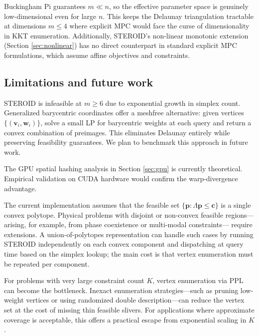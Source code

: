 \documentclass[review,onefignum,onetabnum]{./SIAM_template/siamart171218}
\begin{document}
Buckingham Pi guarantees $m \ll n$, so the effective parameter space is genuinely
low-dimensional even for large $n$.  This keeps the Delaunay triangulation
tractable at dimensions $m \leq 4$ where explicit MPC would face the curse of
dimensionality in KKT enumeration.  Additionally, STEROID's non-linear monotonic
extension (Section \ref{sec:nonlinear}) has no direct counterpart in standard
explicit MPC formulations, which assume affine objectives and constraints.

\subsection{Limitations and future work}

STEROID is infeasible at $m \geq 6$ due to exponential growth in simplex count.
Generalized barycentric coordinates \cite{Hormann2017} offer a meshfree alternative:
given vertices $\{(\mathbf{v}_i, \mathbf{w}_i)\}$, solve a small LP for barycentric
weights at each query and return a convex combination of preimages.  This eliminates
Delaunay entirely while preserving feasibility guarantees.  We plan to benchmark this
approach in future work.

The GPU spatial hashing analysis in Section \ref{sec:gpu} is currently theoretical.
Empirical validation on CUDA hardware would confirm the warp-divergence advantage.

The current implementation assumes that the feasible set $\{\mathbf{p} : \Lambda\mathbf{p} \leq \mathbf{c}\}$
is a single convex polytope.  Physical problems with disjoint or non-convex feasible
regions---arising, for example, from phase coexistence or multi-modal constraints---
require extensions.  A union-of-polytopes representation can handle such cases by
running STEROID independently on each convex component and dispatching at query time
based on the simplex lookup; the main cost is that vertex enumeration must be repeated
per component.

For problems with very large constraint count $K$, vertex enumeration via PPL can
become the bottleneck.  Inexact enumeration strategies---such as pruning low-weight
vertices or using randomized double description---can reduce the vertex set at the cost
of missing thin feasible slivers.  For applications where approximate coverage is
acceptable, this offers a practical escape from exponential scaling in $K$.
\end{document}
